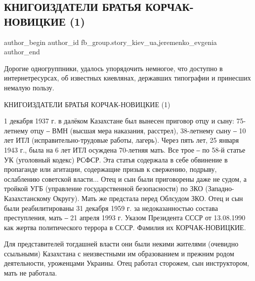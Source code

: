  
 
 
 
 
 
\subsection{КНИГОИЗДАТЕЛИ БРАТЬЯ КОРЧАК-НОВИЦКИЕ (1)}
\label{sec:06_12_2021.fb.fb_group.story_kiev_ua.2.knigoizdateli_bratja_novickie}
 
\ifcmt
 author_begin
   author_id fb_group.story_kiev_ua,jeremenko_evgenia
 author_end
\fi


Дорогие одногруппники, удалось упорядочить немногое, что доступно в
интернетресурсах, об известных киевлянах, державших типографии и принесших
немалую пользу.

КНИГОИЗДАТЕЛИ БРАТЬЯ КОРЧАК-НОВИЦКИЕ (1)

1 декабря 1937 г. в далёком Казахстане был вынесен приговор отцу и сыну:
75-летнему отцу ‒ ВМН (высшая мера наказания, расстрел), 38-летнему сыну ‒ 10
лет ИТЛ (исправительно-трудовые работы, лагерь). Через пять лет, 25 января 1943
г., была на 6 лет ИТЛ осуждена 70-летняя мать. Все трое ‒ по 58-й статье УК
(уголовный кодекс) РСФСР. Эта статья содержала в себе обвинение в пропаганде
или агитации, содержащие призыв к свержению, подрыву, ослаблению советской
власти... Отец и сын были приговорены даже не судом, а тройкой УГБ (управление
государственной безопасности) по ЗКО (Западно-Казахстанскому Округу). Мать же
предстала перед Облсудом ЗКО. Отец и сын были реабилитированы 31 декабря 1959
г. за недоказанностью состава преступления, мать ‒ 21 апреля 1993 г. Указом
Президента СССР от 13.08.1990 как жертва политического террора в СССР. Фамилия
их КОРЧАК-НОВИЦКИЕ.


Для представителей тогдашней власти они были некими жителями (очевидно
ссыльными) Казахстана с неизвестными им образованием и прежним родом
деятельности, уроженцами Украины. Отец работал сторожем, сын инструктором, мать
не работала.


